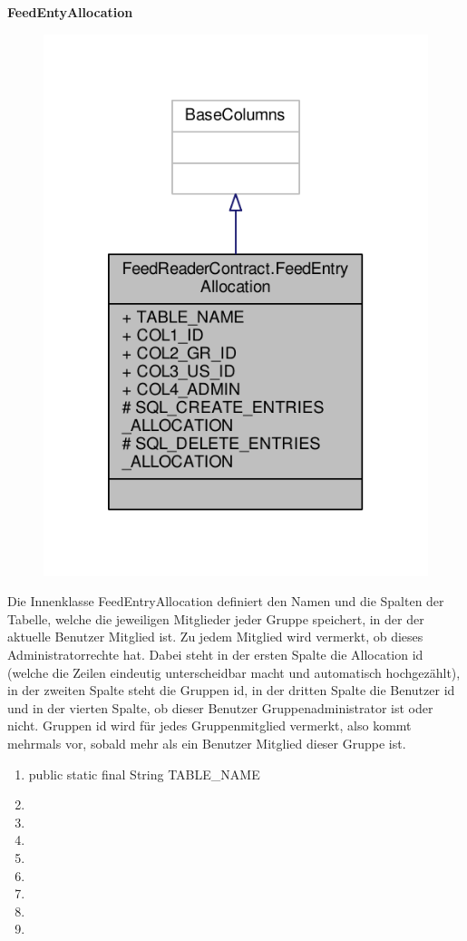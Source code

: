 \textbf{FeedEntyAllocation}
\begin{figure}[H]
	\includegraphics[scale = 1]{res/umlClasses/feed_reader_contract_allocation.pdf}
	\centering
\end{figure}
Die Innenklasse FeedEntryAllocation definiert den Namen und die Spalten der Tabelle, welche die jeweiligen Mitglieder jeder Gruppe speichert, in der der aktuelle Benutzer Mitglied ist. Zu jedem Mitglied wird vermerkt, ob dieses Administratorrechte hat.
Dabei steht in der ersten Spalte die Allocation id (welche die Zeilen eindeutig unterscheidbar macht und automatisch hochgezählt), in der zweiten Spalte steht die Gruppen id, in der dritten Spalte die Benutzer id und in der vierten Spalte, ob dieser Benutzer Gruppenadministrator ist oder nicht. 
Gruppen id wird für jedes Gruppenmitglied vermerkt, also kommt mehrmals vor, sobald mehr als ein Benutzer Mitglied dieser Gruppe ist. 
\begin{enumerate}
	\item public static final String TABLE_NAME
	\item
	\item
	\item
	\item
	\item
	\item
	\item
	\item
\end{enumerate}


